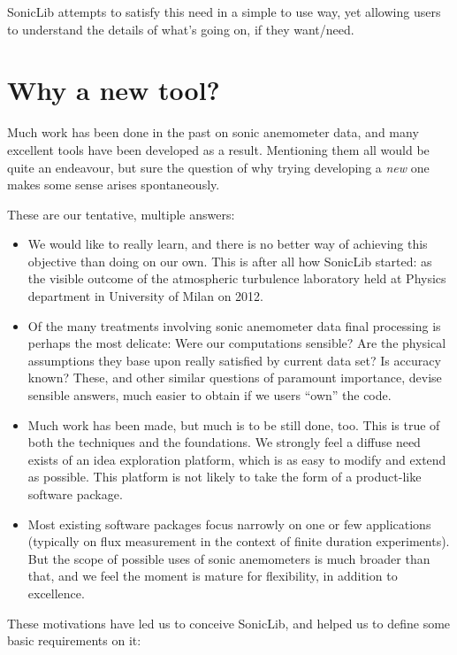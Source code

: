 \documentclass[a4paper,10pt]{book}
\begin{document}
SonicLib attempts to satisfy this need in a simple to use way, yet allowing users to understand the details of what's going on, if they want/need.

\section{Why a new tool?}
\label{sec:SonicLib motivation}

Much work has been done in the past on sonic anemometer data, and many excellent tools have been developed as a result. Mentioning them all would be quite an endeavour, but sure the question of why trying developing a \emph{new} one makes some sense arises spontaneously.

These are our tentative, multiple answers:

\begin{itemize}
 \item We would like to really learn, and there is no better way of achieving this objective than doing on our own. This is after all how SonicLib started: as the visible outcome of the atmospheric turbulence laboratory held at Physics department in University of Milan on 2012.
 \item Of the many treatments involving sonic anemometer data final processing is perhaps the most delicate: Were our computations sensible? Are the physical assumptions they base upon really satisfied by current data set? Is accuracy known? These, and other similar questions of paramount importance, devise sensible answers, much easier to obtain if we users ``own'' the code.
 \item Much work has been made, but much is to be still done, too. This is true of both the techniques and the foundations. We strongly feel a diffuse need exists of an idea exploration platform, which is as easy to modify and extend as possible. This platform is not likely to take the form of a product-like software package.
 \item Most existing software packages focus narrowly on one or few applications (typically on flux measurement in the context of finite duration experiments). But the scope of possible uses of sonic anemometers is much broader than that, and we feel the moment is mature for flexibility, in addition to excellence.
\end{itemize}

These motivations have led us to conceive SonicLib, and helped us to define some basic requirements on it:
\end{document}
